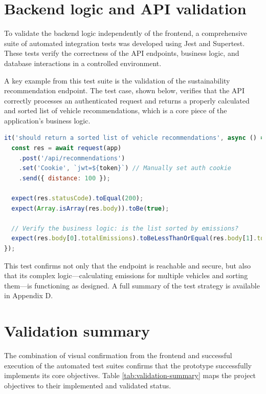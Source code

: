 \section{Backend logic and API validation}
To validate the backend logic independently of the frontend, a comprehensive suite of automated integration tests was developed using Jest and Supertest. These tests verify the correctness of the API endpoints, business logic, and database interactions in a controlled environment.

A key example from this test suite is the validation of the sustainability recommendation endpoint. The test case, shown below, verifies that the API correctly processes an authenticated request and returns a properly calculated and sorted list of vehicle recommendations, which is a core piece of the application's business logic.

\begin{lstlisting}[language=JavaScript, caption={Integration test for the recommendation API from \texttt{tests/backend/features.test.js}}]
it('should return a sorted list of vehicle recommendations', async () => {
  const res = await request(app)
    .post('/api/recommendations')
    .set('Cookie', `jwt=${token}`) // Manually set auth cookie
    .send({ distance: 100 });

  expect(res.statusCode).toEqual(200);
  expect(Array.isArray(res.body)).toBe(true);
  
  // Verify the business logic: is the list sorted by emissions?
  expect(res.body[0].totalEmissions).toBeLessThanOrEqual(res.body[1].totalEmissions);
});
\end{lstlisting}
This test confirms not only that the endpoint is reachable and secure, but also that its complex logic—calculating emissions for multiple vehicles and sorting them—is functioning as designed. A full summary of the test strategy is available in Appendix D.

\section{Validation summary}
The combination of visual confirmation from the frontend and successful execution of the automated test suites confirms that the prototype successfully implements its core objectives. Table \ref{tab:validation-summary} maps the project objectives to their implemented and validated status.

